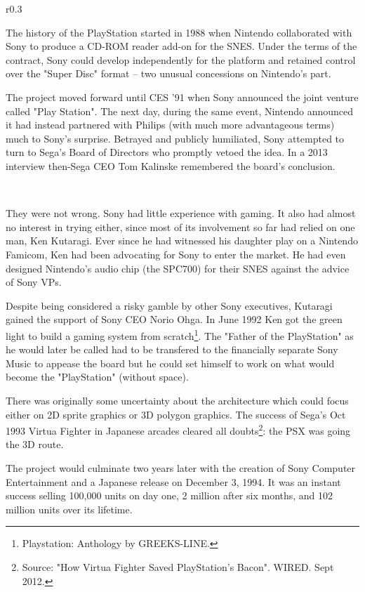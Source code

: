 \begin{wrapfigure}[11]{r}{0.3\textwidth}{
\centering {}}
\end{wrapfigure}
The history of the PlayStation started in 1988 when Nintendo collaborated with Sony to produce a CD-ROM reader add-on for the SNES. Under the terms of the contract, Sony could develop independently for the platform and retained control over the "Super Disc" format -- two unusual concessions on Nintendo's part.\\
\par
 The project moved forward until CES '91 when Sony announced the joint venture called "Play Station". The next day, during the same event, Nintendo announced it had instead partnered with Philips (with much more advantageous terms) much to Sony's surprise. Betrayed and publicly humiliated, Sony attempted to turn to Sega's Board of Directors who promptly vetoed the idea. In a 2013 interview then-Sega CEO Tom Kalinske remembered the board's conclusion.\\
\par
{}\\
\par
They were not wrong. Sony had little experience with gaming. It also had almost no interest in trying either, since most of its involvement so far had relied on one man, Ken Kutaragi. Ever since he had witnessed his daughter play on a Nintendo Famicom, Ken had been advocating for Sony to enter the market. He had even designed Nintendo's audio chip (the SPC700) for their SNES against the advice of Sony VPs.\\
\par
 Despite being considered a risky gamble by other Sony executives, Kutaragi gained the support of Sony CEO Norio Ohga. In June 1992 Ken got the green light to build a gaming system from scratch\footnote{Playstation: Anthology by GREEKS-LINE.}. The "Father of the PlayStation" as he would later be called had to be transfered to the financially separate Sony Music to appease the board but he could set himself to work on what would become the "PlayStation" (without space).\\
\par
There was originally some uncertainty about the architecture which could focus either on 2D sprite graphics or 3D polygon graphics. The success of Sega's Oct 1993 Virtua Fighter in Japanese arcades cleared all doubts\footnote{Source: "How Virtua Fighter Saved PlayStation's Bacon". WIRED. Sept 2012.}: the PSX was going the 3D route.\\
\par
The project would culminate two years later with the creation of Sony Computer Entertainment and a Japanese release on December 3, 1994. It was an instant success selling 100,000 units on day one, 2 million after six months, and 102 million units over its lifetime.\\
\par

